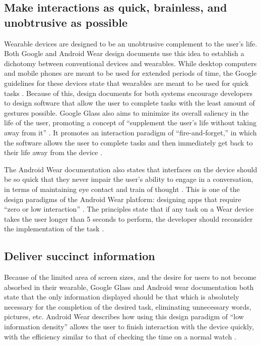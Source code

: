 \documentclass[12pt]{article}
\begin{document}
\subsection{Make interactions as quick, brainless, and unobtrusive as possible}
Wearable devices are designed to be an unobtrusive complement to the user's life. Both Google and Android Wear design documents use this idea to establish a dichotomy between conventional devices and wearables. While desktop computers and mobile phones are meant to be used for extended periods of time, the Google guidelines for these devices state that wearables are meant to be used for quick tasks \cite{andr} \cite{goog}. Because of this, design documents for both systems encourage developers to design software that allow the user to complete tasks with the least amount of gestures possible. Google Glass also aims to minimize its overall saliency in the life of the user, promoting a concept of ``supplement the user's life without taking away from it'' \cite{goog}. It promotes an interaction paradigm of ``fire-and-forget,'' in which the software allows the user to complete tasks and then immediately get back to their life away from the device \cite{goog}.

The Android Wear documentation also states that interfaces on the device should be so quick that they never impair the user's ability to engage in a conversation, in terms of maintaining eye contact and train of thought \cite{andr}. This is one of the design paradigms of the Android Wear platform: designing apps that require ``zero or low interaction'' \cite{andr2}. The principles state that if any task on a Wear device takes the user longer than 5 seconds to perform, the developer should reconsider the implementation of the task \cite{andr}.

\subsection{Deliver succinct information}
Because of the limited area of screen sizes, and the desire for users to not become absorbed in their wearable, Google Glass and Android wear documentation both state that the only information displayed should be that which is absolutely necessary for the completion of the desired task, eliminating unnecessary words, pictures, etc. Android Wear describes how using this design paradigm of ``low information density'' allows the user to finish interaction with the device quickly, with the efficiency similar to that of checking the time on a normal watch \cite{andr3}. 
\end{document}
